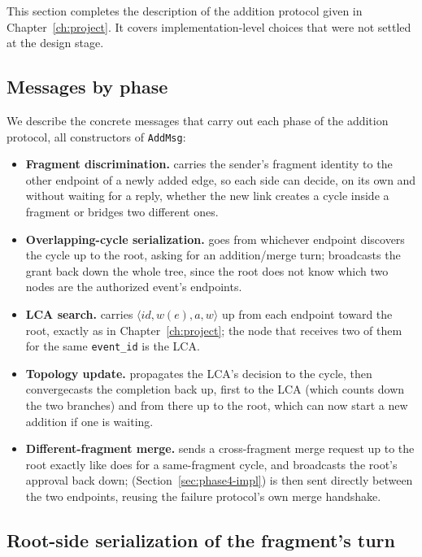 This section completes the description of the addition protocol given in Chapter~\ref{ch:project}. It covers implementation-level choices that were not
settled at the design stage.

\subsection{Messages by phase}\label{sec:addition-messages}

We describe the concrete messages that carry out each phase of the addition protocol, 
all constructors of \texttt{AddMsg}:

\begin{itemize}
  \item \textbf{Fragment discrimination.}  carries the sender's fragment
  identity to the other endpoint of a newly added edge, so each side can decide, on its
  own and without waiting for a reply, whether the new link creates a cycle inside a
  fragment or bridges two different ones.
  \item \textbf{Overlapping-cycle serialization.}  goes from
  whichever endpoint discovers the cycle up to the root, asking for an
  addition/merge turn;  broadcasts the grant back down the whole tree,
  since the root does not know which two nodes are the authorized event's endpoints.
  \item \textbf{LCA search.}  carries $\langle id, w(e), a, w\rangle$ up
  from each endpoint toward the root, exactly as in Chapter~\ref{ch:project}; the node
  that receives two of them for the same \texttt{event\_id} is the LCA.
  \item \textbf{Topology update.}  propagates the LCA's decision to the
  cycle, then  convergecasts the completion back up, first to the LCA (which counts
  down the two branches) and from there up to the root, which can now start a new addition 
  if one is waiting.
  \item \textbf{Different-fragment merge.}  sends a
  cross-fragment merge request up to the root exactly like  does for
  a same-fragment cycle, and  broadcasts the root's approval
  back down;  (Section~\ref{sec:phase4-impl}) is then sent directly between
  the two endpoints, reusing the failure protocol's own merge handshake.
\end{itemize}

\subsection{Root-side serialization of the fragment's turn}\label{sec:addition-turn}

